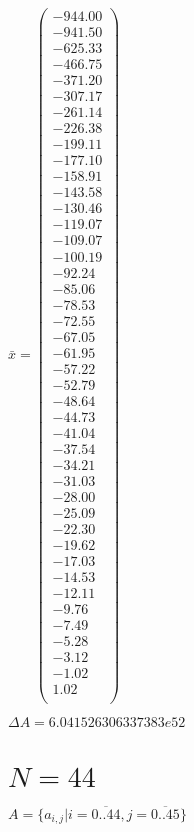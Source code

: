 \documentclass[a4paper,12pt]{article}
\begin{document}
$\bar { x } = \begin{pmatrix}
-944.00 \\
-941.50 \\
-625.33 \\
-466.75 \\
-371.20 \\
-307.17 \\
-261.14 \\
-226.38 \\
-199.11 \\
-177.10 \\
-158.91 \\
-143.58 \\
-130.46 \\
-119.07 \\
-109.07 \\
-100.19 \\
-92.24 \\
-85.06 \\
-78.53 \\
-72.55 \\
-67.05 \\
-61.95 \\
-57.22 \\
-52.79 \\
-48.64 \\
-44.73 \\
-41.04 \\
-37.54 \\
-34.21 \\
-31.03 \\
-28.00 \\
-25.09 \\
-22.30 \\
-19.62 \\
-17.03 \\
-14.53 \\
-12.11 \\
-9.76 \\
-7.49 \\
-5.28 \\
-3.12 \\
-1.02 \\
1.02 \\
\end{pmatrix}
$

$\Delta A = 6.041526306337383e52$



\section{ $N = 44$ }
$A = \{ a _{ i, j } | i = \overline { 0..44 }, j = \overline { 0..45 } \}$
\end{document}
